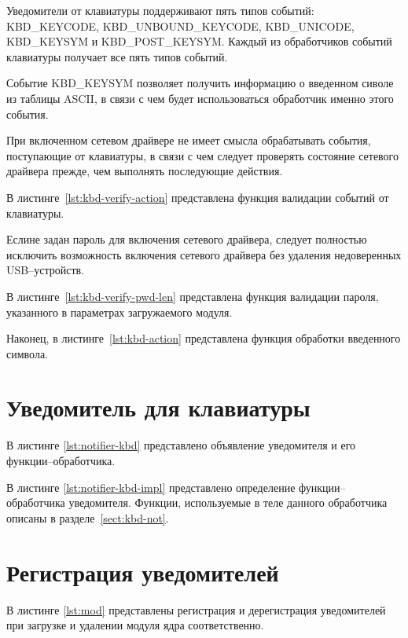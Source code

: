Уведомители от клавиатуры поддерживают пять типов событий: KBD\_KEYCODE, KBD\_UNBOUND\_KEYCODE, KBD\_UNICODE, KBD\_KEYSYM и KBD\_POST\_KEYSYM. Каждый из обработчиков событий клавиатуры получает все пять типов событий. 

Событие KBD\_KEYSYM позволяет получить информацию о введенном сиволе из таблицы ASCII, в связи с чем будет использоваться обработчик именно этого события.

При включенном сетевом драйвере не имеет смысла обрабатывать события, поступающие от клавиатуры, в связи с чем следует проверять состояние сетевого драйвера прежде, чем выполнять последующие действия.

В листинге~\ref{lst:kbd-verify-action} представлена функция валидации событий от клавиатуры.

Еслине задан пароль для включения сетевого драйвера, следует полностью исключить возможность включения сетевого драйвера без удаления недоверенных USB--устройств. 

В листинге~\ref{lst:kbd-verify-pwd-len} представлена функция валидации пароля, указанного в параметрах загружаемого модуля.

Наконец, в листинге~\ref{lst:kbd-action} представлена функция обработки введенного символа.

\section{Уведомитель для клавиатуры}

В листинге \ref{lst:notifier-kbd} представлено объявление уведомителя и его функции--обработчика.


В листинге \ref{lst:notifier-kbd-impl} представлено определение функции--обработчика уведомителя. Функции, используемые в теле данного обработчика описаны в разделе~\ref{sect:kbd-not}.

     
\section{Регистрация уведомителей}

В листинге \ref{lst:mod} представлены регистрация и дерегистрация уведомителей при загрузке и удалении модуля ядра соответственно.

